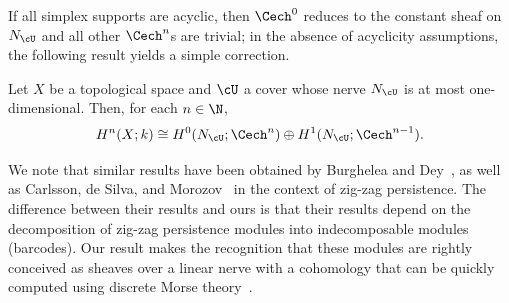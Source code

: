 If all simplex supports are acyclic, then $\Cech^0$ reduces to the constant sheaf on $N_{\cU}$ and all other $\Cech^n$s are trivial; in the absence of acyclicity assumptions, the following result yields a simple correction.

\begin{prop}
\label{prop:cechsheaf}
Let $X$ be a topological space and $\cU$ a cover whose nerve $N_\cU$ is at most one-dimensional. Then, for each $n \in \N$,
\begin{equation*}
		H^n(X;k) \cong H^0(N_\cU;\Cech^n)\oplus H^1(N_\cU;\Cech^{n-1}).
\end{equation*}
\end{prop}

We note that similar results have been obtained by Burghelea and Dey~\cite{dey_circle}, as well as Carlsson, de Silva, and Morozov~\cite{pyramid} in the context of zig-zag persistence. The difference between their results and ours is that their results depend on the decomposition of zig-zag persistence modules into indecomposable modules (barcodes). Our result makes the recognition that these modules are rightly conceived as sheaves over a linear nerve with a cohomology that can be quickly computed using discrete Morse theory~\cite{DMT_sheaves}.

